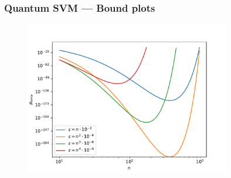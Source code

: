 \begin{frame}
    \frametitle{Quantum SVM --- Bound plots}

    \begin{figure}
        \includegraphics[width=0.8\textwidth]{figures/perrorscaled.pdf}
    \end{figure}

\end{frame}